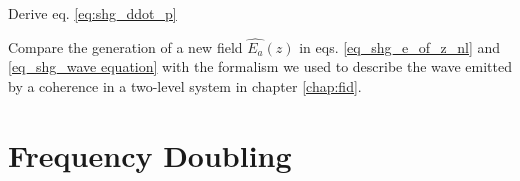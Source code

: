 \begin{questions}

\item Derive eq. \ref{eq:shg_ddot_p}

\item Compare the generation of a new field $\hat{E_a}(z)$ in eqs. \ref{eq_shg_e_of_z_nl} and   \ref{eq_shg_wave equation} with the formalism we used to describe the wave emitted by a coherence in a two-level system in chapter \ref{chap:fid}.


\end{questions}


\section{Frequency Doubling}

